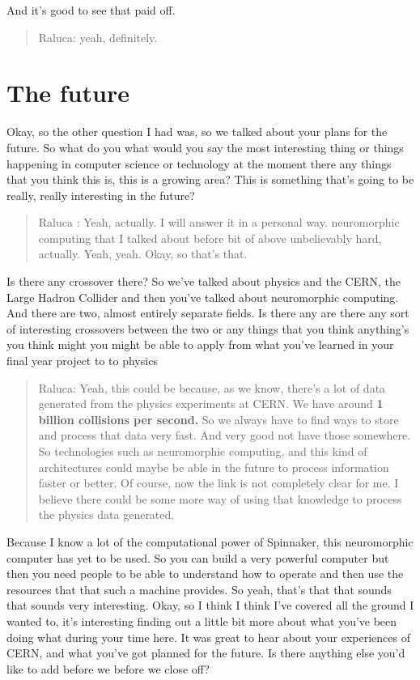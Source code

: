 \documentclass[
]{book}
\begin{document}
And it's good to see that paid off.

\begin{quote}
Raluca: yeah, definitely.
\end{quote}

\hypertarget{the-future}{%
\section{The future}\label{the-future}}

Okay, so the other question I had was, so we talked about your plans for the future. So what do you what would you say the most interesting thing or things happening in computer science or technology at the moment there any things that you think this is, this is a growing area? This is something that's going to be really, really interesting in the future?

\begin{quote}
Raluca : Yeah, actually. I will answer it in a personal way. neuromorphic computing that I talked about before bit of above unbelievably hard, actually. Yeah, yeah. Okay, so that's that.
\end{quote}

Is there any crossover there? So we've talked about physics and the CERN, the Large Hadron Collider and then you've talked about neuromorphic computing. And there are two, almost entirely separate fields. Is there any are there any sort of interesting crossovers between the two or any things that you think anything's you think might you might be able to apply from what you've learned in your final year project to to physics

\begin{quote}
Raluca: Yeah, this could be because, as we know, there's a lot of data generated from the physics experiments at CERN. We have around \textbf{1 billion collisions per second.} So we always have to find ways to store and process that data very fast. And very good not have those somewhere. So technologies such as neuromorphic computing, and this kind of architectures could maybe be able in the future to process information faster or better. Of course, now the link is not completely clear for me. I believe there could be some more way of using that knowledge to process the physics data generated.
\end{quote}

Because I know a lot of the computational power of Spinnaker, this neuromorphic computer has yet to be used. So you can build a very powerful computer but then you need people to be able to understand how to operate and then use the resources that that such a machine provides. So yeah, that's that that sounds that sounds very interesting. Okay, so I think I think I've covered all the ground I wanted to, it's interesting finding out a little bit more about what you've been doing what during your time here. It was great to hear about your experiences of CERN, and what you've got planned for the future. Is there anything else you'd like to add before we before we close off?
\end{document}
